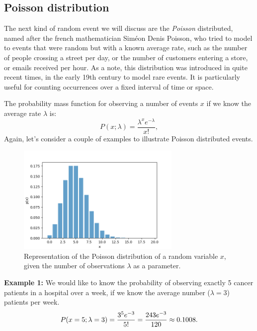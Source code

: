 \documentclass{book}
\begin{document}
\newpage
\subsection{Poisson distribution}
The next kind of random event we will discuss are the \textit{Poisson} distributed, named after the french mathematician Sim\'eon Denis Poisson, who tried to model to events that were random but with a known average rate, such as the number of people crossing a street per day, or the number of customers entering a store, or emails received per hour.
As a note, this distribution was introduced in quite recent times, in the early 19th century to model rare events. It is particularly useful for counting occurrences over a fixed interval of time or space. 

The probability mass function for observing a number of events $x$ if we know the average rate $\lambda$ is:
\begin{equation}
    P(x; \lambda) = \frac{\lambda^x e^{-\lambda}}{x!},
\end{equation}
Again, let's consider a couple of examples to illustrate Poisson distributed events.

\begin{figure}[ht]
    \centering
    \includegraphics[width=0.7\textwidth]{figures/chapter2/poisson.png}
    \caption{Representation of the Poisson distribution of a random variable $x$, given the number of observations $\lambda$ as a parameter.}
    \label{fig:random}
\end{figure}

\textbf{Example 1:} We would like to know the probability of observing exactly 5 cancer patients in a hospital over a week, if we know the average number ($\lambda = 3$) patients per week.
\begin{equation}
    P(x=5; \lambda = 3) = \frac{3^5 e^{-3}}{5!} = \frac{243 e^{-3}}{120} \approx 0.1008. \notag
\end{equation}\\
\end{document}
